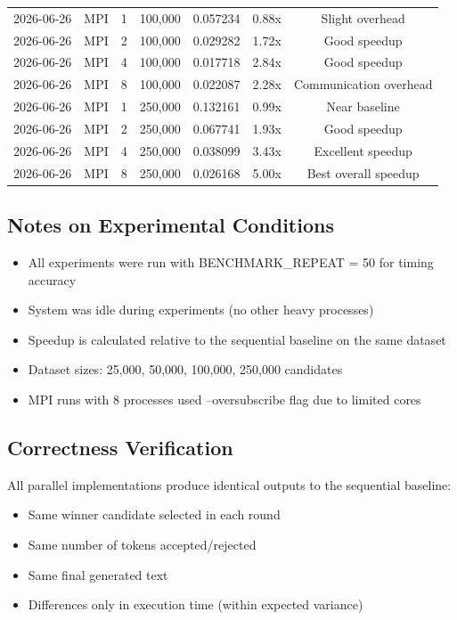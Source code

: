 \documentclass[12pt]{article}
\begin{document}
\begin{longtable}{|c|c|c|c|c|c|c|}
2026-06-26 & MPI & 1 & 100,000 & 0.057234 & 0.88x & Slight overhead \\
2026-06-26 & MPI & 2 & 100,000 & 0.029282 & 1.72x & Good speedup \\
2026-06-26 & MPI & 4 & 100,000 & 0.017718 & 2.84x & Good speedup \\
2026-06-26 & MPI & 8 & 100,000 & 0.022087 & 2.28x & Communication overhead \\
2026-06-26 & MPI & 1 & 250,000 & 0.132161 & 0.99x & Near baseline \\
2026-06-26 & MPI & 2 & 250,000 & 0.067741 & 1.93x & Good speedup \\
2026-06-26 & MPI & 4 & 250,000 & 0.038099 & 3.43x & Excellent speedup \\
2026-06-26 & MPI & 8 & 250,000 & 0.026168 & 5.00x & Best overall speedup \\

\end{longtable}

\subsection*{Notes on Experimental Conditions}

\begin{itemize}
    \item All experiments were run with BENCHMARK\_REPEAT = 50 for timing accuracy
    \item System was idle during experiments (no other heavy processes)
    \item Speedup is calculated relative to the sequential baseline on the same dataset
    \item Dataset sizes: 25,000, 50,000, 100,000, 250,000 candidates
    \item MPI runs with 8 processes used --oversubscribe flag due to limited cores
\end{itemize}

\subsection*{Correctness Verification}

All parallel implementations produce identical outputs to the sequential baseline:
\begin{itemize}
    \item Same winner candidate selected in each round
    \item Same number of tokens accepted/rejected
    \item Same final generated text
    \item Differences only in execution time (within expected variance)
\end{itemize}
\end{document}
